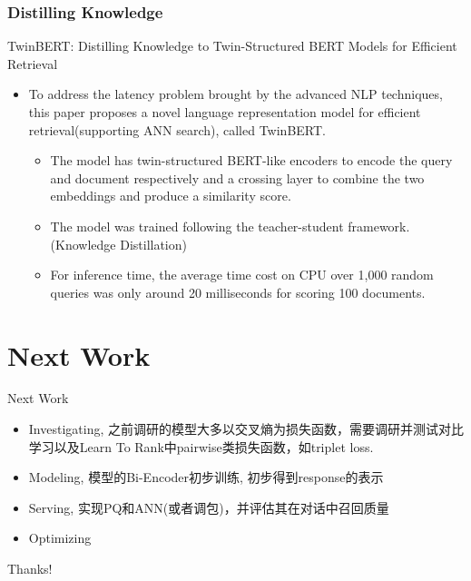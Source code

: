 \documentclass{beamer}
\begin{document}
\subsubsection{Distilling Knowledge}
\begin{frame}{TwinBERT: Distilling Knowledge to Twin-Structured BERT Models for Efficient Retrieval}

\begin{itemize}
    \item To address the latency problem brought by the advanced NLP techniques, this paper proposes a novel language representation model for efficient retrieval(supporting ANN search), called TwinBERT.
    \begin{itemize}
        \item  The model has twin-structured BERT-like encoders to encode the query and document respectively and a crossing layer to combine the two embeddings and produce a similarity score. 
        \item The model was trained following the teacher-student framework. (Knowledge Distillation)
        \item For inference time, the average time cost on CPU over 1,000 random queries was only around 20 milliseconds for scoring 100 documents.
    \end{itemize}
\end{itemize}
    
\end{frame}

\section{Next Work}
\begin{frame}{Next Work}
    \begin{itemize}
        \item Investigating, 之前调研的模型大多以交叉熵为损失函数，需要调研并测试对比学习以及Learn To Rank中pairwise类损失函数，如triplet loss.
        \item Modeling, 模型的Bi-Encoder初步训练, 初步得到response的表示
        \item Serving, 实现PQ和ANN(或者调包)，并评估其在对话中召回质量
        \item Optimizing
    \end{itemize}
\end{frame}

\begin{frame}
    \begin{center}
        {\Huge\calligra Thanks!}
    \end{center}
\end{frame}
\end{document}
